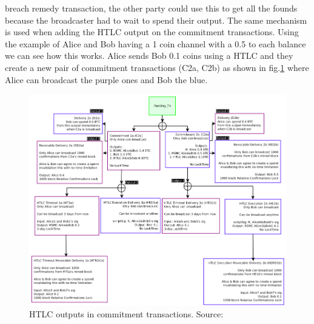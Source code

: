breach remedy transaction, the other party could use this to get all the founds because the broadcaster had to wait to spend their output.
The same mechanism is used when adding the HTLC output on the commitment transactions. Using the example of Alice and Bob having a 1 coin channel with a 0.5 to each balance we can see how this works. Alice sends Bob 0.1 coins using a HTLC and they create a new pair of commitment transactions (C2a, C2b) as shown in fig.\ref{fig:htlc_commit} where Alice can broadcast the purple ones and Bob the blue.


\begin{figure}[h]
    \centering
    \includegraphics[width=14cm]{figures/ln_htlc.png}
    \caption{HTLC outputs in commitment transactions.  Source: \cite{poon2015bitcoin}}
    \label{fig:htlc_commit}
\end{figure}


